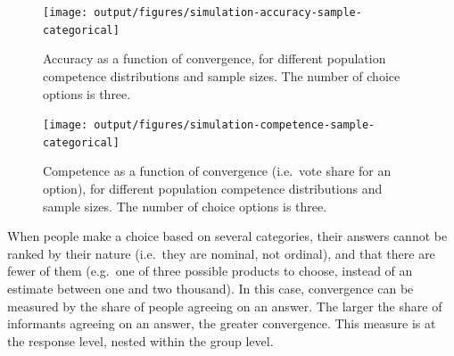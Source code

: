 \documentclass[
  doc,floatsintext]{apa6}
\begin{document}
\begin{figure}
\texttt{[image: output/figures/simulation-accuracy-sample-categorical]} \caption{Accuracy as a function of convergence, for different population competence distributions and sample sizes. The number of choice options is three.}\label{fig:simulation-accuracy-sample-categorical}
\end{figure}



\begin{figure}
\texttt{[image: output/figures/simulation-competence-sample-categorical]} \caption{Competence as a function of convergence (i.e.~vote share for an option), for different population competence distributions and sample sizes. The number of choice options is three.}\label{fig:simulation-competence-sample-categorical}
\end{figure}

When people make a choice based on several categories, their answers cannot be ranked by their nature (i.e.~they are nominal, not ordinal), and that there are fewer of them (e.g.~one of three possible products to choose, instead of an estimate between one and two thousand). In this case, convergence can be measured by the share of people agreeing on an answer. The larger the share of informants agreeing on an answer, the greater convergence. This measure is at the response level, nested within the group level.
\end{document}
